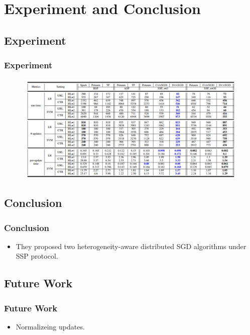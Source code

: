 \section{Experiment and Conclusion}

\subsection{Experiment}
\begin{frame}
    \frametitle{Experiment}
	\begin{figure}
		\includegraphics[scale=0.3]{figure/experiment.png}
	\end{figure}
\end{frame}

\subsection{Conclusion}
\begin{frame}
	\frametitle{Conclusion}
	\begin{itemize}
		\item They proposed two heterogeneity-aware distributed SGD algorithms under SSP protocol.
	\end{itemize} 
\end{frame}

\subsection{Future Work}
\begin{frame}
	\frametitle{Future Work}
	\begin{itemize}
		\item Normalizeing updates. 
	\end{itemize}
\end{frame}



